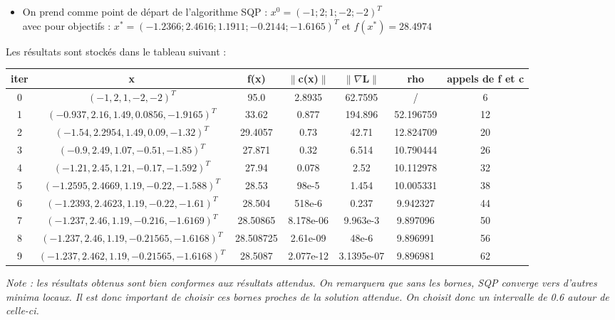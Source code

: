 \begin{itemize}
\item On prend comme point de départ de l'algorithme SQP : $x^0 = (-1 ; 2 ; 1 ; -2 ; -2)^{T}$\\
\indent avec pour objectifs : $x^{*} = (-1.2366 ; 2.4616 ; 1.1911 ; -0.2144 ; -1.6165)^{T}$ et $f(x^{*}) = 28.4974$\\
\end{itemize}
Les résultats sont stockés dans le tableau suivant : \smallbreak
{\renewcommand{\arraystretch}{1.5}\setlength{\tabcolsep}{3pt}
\begin{table}[h]\centering \small\begin{tabular}{|c|c|c|c|c|c|c|}
	\hline
 	iter & x & f(x) & $\| $c(x)$ \|$ & $\|    \nabla $L$  \|$ & rho & appels de f et c\\
	\hline
 	0 & $( -1, 2, 1, -2, -2 )^{T}$ & 95.0 & 2.8935 & 62.7595 & / & 6\\
	\hline
 	1 & $(-0.937, 2.16, 1.49, 0.0856, -1.9165)^{T}$ & 33.62 & 0.877 & 194.896 & 52.196759 & 12\\
	\hline
 	2 & $( -1.54, 2.2954, 1.49, 0.09, -1.32 )^{T}$ & 29.4057 & 0.73 & 42.71 & 12.824709 & 20\\
	\hline
 	3 & $( -0.9, 2.49, 1.07, -0.51, -1.85 )^{T}$ & 27.871 & 0.32 & 6.514 & 10.790444 & 26\\
	\hline
 	4 & $( -1.21, 2.45, 1.21, -0.17, -1.592 )^{T}$ & 27.94 & 0.078 & 2.52 & 10.112978 & 32\\
	\hline
 	5 & $( -1.2595, 2.4669, 1.19, -0.22, -1.588 )^{T}$ & 28.53 & 98e-5 & 1.454 & 10.005331 & 38\\
	\hline
 	6 & $( -1.2393, 2.4623, 1.19, -0.22, -1.61)^{T}$ & 28.504 & 518e-6 & 0.237 & 9.942327 & 44\\
	\hline
 	7 & $( -1.237, 2.46, 1.19, -0.216, -1.6169 )^{T}$ & 28.50865 & 8.178e-06 & 9.963e-3 & 9.897096 & 50\\
	\hline
 	8 & $( -1.237, 2.46, 1.19, -0.21565, -1.6168 )^{T}$ & 28.508725 & 2.61e-09 & 48e-6 & 9.896991 & 56\\
	\hline
 	9 & $( -1.237, 2.462, 1.19, -0.21565, -1.6168 )^{T}$ & 28.5087 & 2.077e-12 & 3.1395e-07 & 9.896981 & 62\\

	\hline
\end{tabular}\end{table}
}\normalsize
\bigbreak
\textit{Note : les résultats obtenus sont bien conformes aux résultats attendus. On remarquera que sans les bornes, SQP converge vers d'autres minima locaux. Il est donc important de choisir ces bornes proches de la solution attendue. On choisit donc un intervalle de 0.6
autour de celle-ci.}
\newpage





